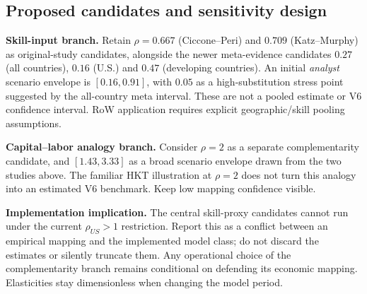 \subsection{Proposed candidates and sensitivity design}
\textbf{Skill-input branch.} Retain $\rho=0.667$ (Ciccone--Peri) and $0.709$ (Katz--Murphy) as original-study candidates, alongside the newer meta-evidence candidates $0.27$ (all countries), $0.16$ (U.S.) and $0.47$ (developing countries). An initial \emph{analyst} scenario envelope is $[0.16,0.91]$, with $0.05$ as a high-substitution stress point suggested by the all-country meta interval. These are not a pooled estimate or V6 confidence interval. RoW application requires explicit geographic/skill pooling assumptions.

\textbf{Capital--labor analogy branch.} Consider $\rho=2$ as a separate complementarity candidate, and $[1.43,3.33]$ as a broad scenario envelope drawn from the two studies above. The familiar HKT illustration at $\rho=2$ does not turn this analogy into an estimated V6 benchmark. Keep low mapping confidence visible.

\textbf{Implementation implication.} The central skill-proxy candidates cannot run under the current $\rho_{US}>1$ restriction. Report this as a conflict between an empirical mapping and the implemented model class; do not discard the estimates or silently truncate them. Any operational choice of the complementarity branch remains conditional on defending its economic mapping. Elasticities stay dimensionless when changing the model period.
